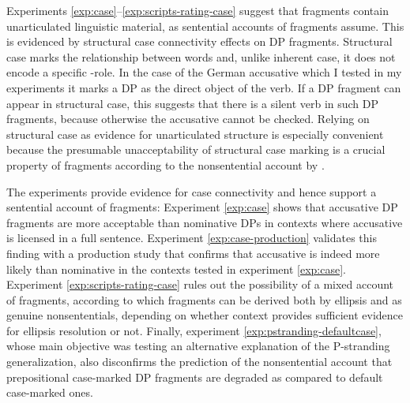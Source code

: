 Experiments \ref{exp:case}--\ref{exp:scripts-rating-case} suggest that fragments contain unarticulated linguistic material, as sentential accounts of fragments assume. This is evidenced by structural case connectivity effects on DP fragments. Structural case marks the relationship between words and, unlike inherent case, it does not encode a specific \texttheta-role. In the case of the German accusative which I tested in my experiments it marks a DP as the direct object of the verb. If a DP fragment can appear in structural case, this suggests that there is a silent verb in such DP fragments, because otherwise the accusative cannot be checked. Relying on structural case as evidence for unarticulated structure is especially convenient because the presumable unacceptability of structural case marking is a crucial property of fragments according to the nonsentential account by  \citet{barton.progovac2005}.

\noindent The experiments provide evidence for case connectivity and hence support a sentential account of fragments: Experiment \ref{exp:case} shows that accusative DP fragments are more acceptable than nominative DPs in contexts where accusative is licensed in a full sentence. Experiment \ref{exp:case-production} validates this finding with a production study that confirms that accusative is indeed more likely than nominative in the contexts tested in experiment \ref{exp:case}. Experiment \ref{exp:scripts-rating-case} rules out the possibility of a mixed account of fragments, according to which fragments can be derived both by ellipsis and as genuine nonsententials, depending on whether context provides sufficient evidence for ellipsis resolution or not. Finally, experiment \ref{exp:pstranding-defaultcase}, whose main objective was testing an alternative explanation of the P-stranding generalization, also disconfirms the prediction of the nonsentential account that prepositional case-marked DP fragments are degraded as compared to default case-marked ones.

